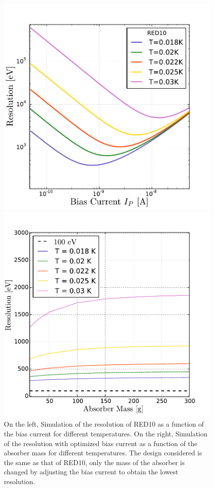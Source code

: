\begin{figure}
\begin{minipage}{0.49\textwidth}
\includegraphics[width=\textwidth]{Figures/Ethem/red10_i.pdf}
\end{minipage}
\hfill
\begin{minipage}{0.49\textwidth}
\includegraphics[width=\textwidth]{Figures/Ethem/red10_mass.pdf}
\end{minipage}
\caption{On the left, Simulation of the resolution of RED10 as a function of the bias current for different temperatures. On the right, Simulation of the resolution with optimized bias current as a function of the absorber mass for different temperatures. The design considered is the same as that of RED10, only the mass of the absorber is changed by adjusting the bias current to obtain the lowest resolution.}
\label{fig:optim}
\end{figure}

